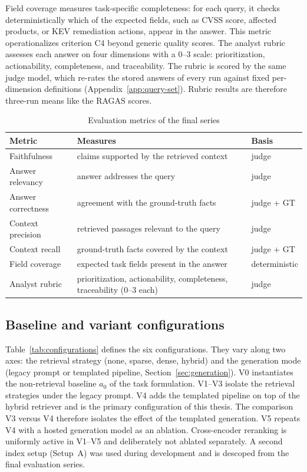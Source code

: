 Field coverage measures task-specific completeness: for each query, it
checks deterministically which of the expected fields, such as CVSS
score, affected products, or KEV remediation actions, appear in the
answer. This metric operationalizes criterion C4 beyond generic quality
scores. The analyst rubric assesses each answer on four dimensions with
a 0--3 scale: prioritization, actionability, completeness, and
traceability. The rubric is scored by the same judge model, which
re-rates the stored answers of every run against fixed per-dimension
definitions (Appendix~\ref{app:query-set}). Rubric results are
therefore three-run means like the RAGAS scores.

\begin{table}[H]
    \centering
    \small
    \begin{tabular}{lp{}l}
        \toprule
        \textbf{Metric} & \textbf{Measures} & \textbf{Basis} \\
        \midrule
        Faithfulness & claims supported by the retrieved context & judge \\
        Answer relevancy & answer addresses the query & judge \\
        Answer correctness & agreement with the ground-truth facts & judge + GT \\
        Context precision & retrieved passages relevant to the query & judge \\
        Context recall & ground-truth facts covered by the context & judge + GT \\
        Field coverage & expected task fields present in the answer & deterministic \\
        Analyst rubric & prioritization, actionability, completeness,
            traceability (0--3 each) & judge \\
        \bottomrule
    \end{tabular}
    \caption{Evaluation metrics of the final series}
    \label{tab:metrics}
\end{table}

\subsection{Baseline and variant configurations}
\label{sec:baselines}

Table~\ref{tab:configurations} defines the six configurations. They vary
along two axes: the retrieval strategy (none, sparse, dense, hybrid) and
the generation mode (legacy prompt or templated pipeline,
Section~\ref{sec:generation}). V0 instantiates the non-retrieval baseline
$a_0$ of the task formulation. V1--V3 isolate the retrieval strategies
under the legacy prompt. V4 adds the templated pipeline on top of the
hybrid retriever and is the primary configuration of this thesis. The
comparison V3 versus V4 therefore isolates the effect of the templated
generation. V5 repeats V4 with a hosted generation model as an ablation.
Cross-encoder reranking is uniformly active in V1--V5 and deliberately
not ablated separately. A second index setup (Setup~A) was used during
development and is descoped from the final evaluation series.

